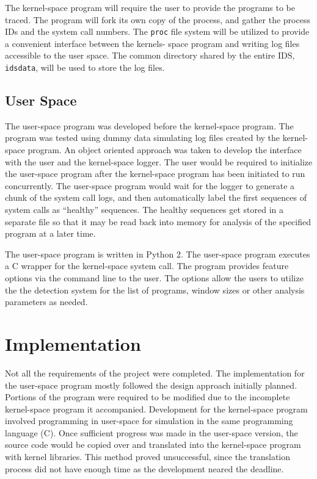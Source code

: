 \documentclass[paper=usletter, fontsize=12pt]{article}
\begin{document}
    The kernel-space program will require the user to provide the programs to
    be traced. The program will fork its own copy of the process, and gather
    the process IDs and the system call numbers. The \texttt{proc} file system
    will be utilized to provide a convenient interface between the kernels-
    space program and writing log files accessible to the user space. The
    common directory shared by the entire IDS, \texttt{idsdata}, will be used
    to store the log files.

    \subsection{User Space} The user-space program was developed before the
    kernel-space program. The program was tested using dummy data simulating
    log files created by the kernel-space program. An object oriented approach
    was taken to develop the interface with the user and the kernel-space
    logger. The user would be required to initialize the user-space program
    after the kernel-space program has been initiated to run concurrently. The
    user-space program would wait for the logger to generate a chunk of the
    system call logs, and then automatically label the first sequences of
    system calls as ``healthy'' sequences. The healthy sequences get stored in
    a separate file so that it may be read back into memory for analysis of the
    specified program at a later time.

    The user-space program is written in Python 2. The user-space program
    executes a C wrapper for the kernel-space system call. The program provides
    feature options via the command line to the user. The options allow the
    users to utilize the the detection system for the list of programs, window
    sizes or other analysis parameters as needed.

    \section{Implementation} Not all the requirements of the project were
    completed. The implementation for the user-space program mostly followed
    the design approach initially planned. Portions of the program were
    required to be modified due to the incomplete kernel-space program it
    accompanied. Development for the kernel-space program involved programming
    in user-space for simulation in the same programming language (C). Once
    sufficient progress was made in the user-space version, the source code
    would be copied over and translated into the kernel-space program with
    kernel libraries. This method proved unsuccessful, since the translation
    process did not have enough time as the development neared the deadline.
\end{document}
